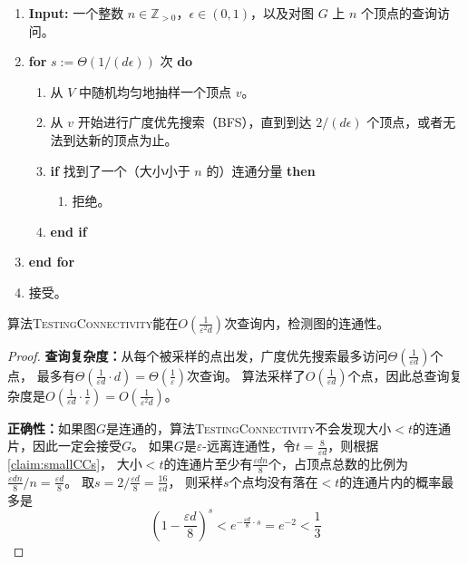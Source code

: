 \documentclass[lang=cn,newtx,10pt,scheme=chinese,chinesefont=nofont,citestyle=gb7714-2015, bibstyle=gb7714-2015]{elegantbook}
\begin{document}
\begin{refsection}
\begin{algorithm}[ht]
\caption{\textbf{连通性检测算法}}
	\label{alg-gilbert0}
\begin{enumerate}
    \item \textbf{Input:} 一个整数 $ n \in \mathbb{Z}_{>0} $，$ \epsilon \in (0, 1) $，以及对图 $ G $ 上 $ n $ 个顶点的查询访问。
    \item \textbf{for} $ s := \Theta(1/(d \epsilon)) $ 次 \textbf{do}
    \begin{enumerate}
        \item 从 $ V $ 中随机均匀地抽样一个顶点 $ v $。
        \item 从 $ v $ 开始进行广度优先搜索（BFS），直到到达 $ 2/(d \epsilon) $ 个顶点，或者无法到达新的顶点为止。
        \item \textbf{if} 找到了一个（大小小于 $ n $ 的）连通分量 \textbf{then}
        \begin{enumerate}
            \item 拒绝。
        \end{enumerate}
        \item \textbf{end if}
    \end{enumerate}
    \item \textbf{end for}
    \item 接受。
\end{enumerate}
\end{algorithm}


\begin{theorem}
    算法\textsc{TestingConnectivity}能在$O(\frac{1}{\varepsilon^2d})$次查询内，检测图的连通性。
\end{theorem}

\begin{proof}
    \textbf{查询复杂度：}从每个被采样的点出发，广度优先搜索最多访问$\Theta(\frac{1}{\varepsilon d})$个点，
    最多有$\Theta(\frac{1}{\varepsilon d}\cdot d)=\Theta(\frac{1}{\varepsilon})$次查询。
    算法采样了$O(\frac{1}{\varepsilon d})$个点，因此总查询复杂度是$O(\frac{1}{\varepsilon d}\cdot\frac{1}{\varepsilon})=O(\frac{1}{\varepsilon^2 d})$。

    \textbf{正确性：}如果图$G$是连通的，算法\textsc{TestingConnectivity}不会发现大小$<t$的连通片，因此一定会接受$G$。
    如果$G$是$\varepsilon$-远离连通性，令$t=\frac{8}{\varepsilon d}$，则根据\cref{claim:smallCCs}，
    大小$<t$的连通片至少有$\frac{\varepsilon dn}{8}$个，占顶点总数的比例为$\frac{\varepsilon dn}{8}/n=\frac{\varepsilon d}{8}$。
    取$s=2/\frac{\varepsilon d}{8}=\frac{16}{\varepsilon d}$，
    则采样$s$个点均没有落在$<t$的连通片内的概率最多是
    \[
    \left(1-\frac{\varepsilon d}{8}\right)^s<e^{-\frac{\varepsilon d}{8}\cdot s}=e^{-2}<\frac{1}{3}
    \]


\end{proof}
\end{refsection}
\end{document}
